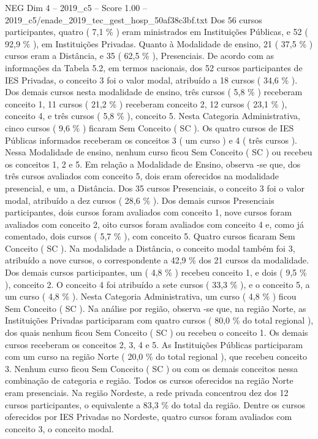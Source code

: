 \begin{textsample}{NEG Dim 4 – 2019\_c5 – Score 1.00 – 2019\_c5/enade\_2019\_tec\_gest\_hosp\_50af38c3bf.txt}
Dos 56 cursos participantes, quatro ( 7,1 \% ) eram ministrados em Instituições Públicas, e 52 ( 92,9 \% ), em Instituições Privadas.
Quanto à Modalidade de ensino, 21 ( 37,5 \% ) cursos eram a Distância, e 35 ( 62,5 \% ), Presenciais.
De acordo com as informações da Tabela 5.2, em termos nacionais, dos 52 cursos participantes de IES Privadas, o conceito 3 foi o valor modal, atribuído a 18 cursos ( 34,6 \% ).
Dos demais cursos nesta modalidade de ensino, três cursos ( 5,8 \% ) receberam conceito 1, 11 cursos ( 21,2 \% ) receberam conceito 2, 12 cursos ( 23,1 \% ), conceito 4, e três cursos ( 5,8 \% ), conceito 5.
Nesta Categoria Administrativa, cinco cursos ( 9,6 \% ) ficaram Sem Conceito ( SC ).
Os quatro cursos de IES Públicas informados receberam os conceitos 3 ( um curso ) e 4 ( três cursos ).
Nessa Modalidade de ensino, nenhum curso ficou Sem Conceito ( SC ) ou recebeu os conceitos 1, 2 e 5.
Em relação a Modalidade de Ensino, observa -se que, dos três cursos avaliados com conceito 5, dois eram oferecidos na modalidade presencial, e um, a Distância.
Dos 35 cursos Presenciais, o conceito 3 foi o valor modal, atribuído a dez cursos ( 28,6 \% ).
Dos demais cursos Presenciais participantes, dois cursos foram avaliados com conceito 1, nove cursos foram avaliados com conceito 2, oito cursos foram avaliados com conceito 4 e, como já comentado, dois cursos ( 5,7 \% ), com conceito 5.
Quatro cursos ficaram Sem Conceito ( SC ).
Na modalidade a Distância, o conceito modal também foi 3, atribuído a nove cursos, o correspondente a 42,9 \% dos 21 cursos da modalidade.
Dos demais cursos participantes, um ( 4,8 \% ) recebeu conceito 1, e dois ( 9,5 \% ), conceito 2.
O conceito 4 foi atribuído a sete cursos ( 33,3 \% ), e o conceito 5, a um curso ( 4,8 \% ).
Nesta Categoria Administrativa, um curso ( 4,8 \% ) ficou Sem Conceito ( SC ).
Na análise por região, observa -se que, na região Norte, as Instituições Privadas participaram com quatro cursos ( 80,0 \% do total regional ), dos quais nenhum ficou Sem Conceito ( SC ) ou recebeu o conceito 1.
Os demais cursos receberam os conceitos 2, 3, 4 e 5.
As Instituições Públicas participaram com um curso na região Norte ( 20,0 \% do total regional ), que recebeu conceito 3.
Nenhum curso ficou Sem Conceito ( SC ) ou com os demais conceitos nessa combinação de categoria e região.
Todos os cursos oferecidos na região Norte eram presenciais.
Na região Nordeste, a rede privada concentrou dez dos 12 cursos participantes, o equivalente a 83,3 \% do total da região.
Dentre os cursos oferecidos por IES Privadas no Nordeste, quatro cursos foram avaliados com conceito 3, o conceito modal.

\end{textsample}
